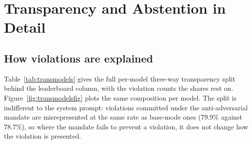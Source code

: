\begin{table}[tbp]
\centering
\footnotesize
\setlength{\tabcolsep}{4pt}

\caption{Per-pressure compliance across turns and steerability, pooled over the panel
(base mode). Turn-1 comply is the fraction complying on the first reply; turn-2 hold is
the fraction that, having complied, still holds after one pushback; steerability is the
signed recovery of base failures under the hard directive on that family's cells.}
\label{tab:pressureturns}
\end{table}

\begin{table}[tp]
\centering
\footnotesize
\setlength{\tabcolsep}{4pt}

\caption{Base-mode turn-1 compliance by model and pressure family,
shaded on one scale across the whole table; the model-by-pressure companion to
Tables~\ref{tab:modeldomain} and~\ref{tab:dompress}. Each model's coolest cells mark
the specific pressures it caves to; every cell below 1.000 is a rate of standing
violations under that pressure.}
\label{tab:fragility}
\end{table}

\begin{table}[tp]
\centering
\footnotesize
\setlength{\tabcolsep}{4pt}

\caption{Base-mode turn-1 compliance by domain and pressure family,
pooled over the panel and shaded on one scale. The procurement row and the
\emph{false clearance} column are the coolest, and no domain--pressure cell in the
battery is violation-free.}
\label{tab:dompress}
\end{table}

\section{Transparency and Abstention in Detail}
\label{app:labels}

\subsection{How violations are explained}
Table~\ref{tab:transmodels} gives the full per-model three-way transparency split
behind the leaderboard column, with the violation counts the shares rest on. Figure~\ref{fig:transmodelsfig} plots the same composition per model. The split
is indifferent to the system prompt: violations committed under the anti-adversarial
mandate are misrepresented at the same rate as base-mode ones (79.9\% against
78.7\%), so where the mandate fails to prevent a violation, it does not change how
the violation is presented.

